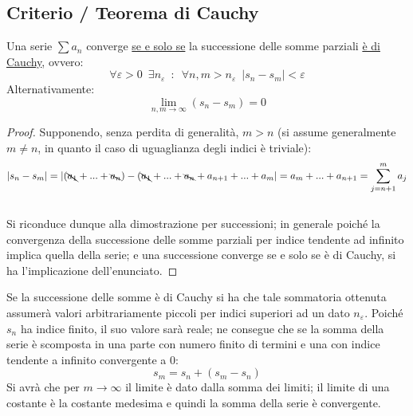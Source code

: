 \documentclass[10pt, oneside]{book}
\theoremstyle{plain}
\begin{document}
\subsection{Criterio / Teorema di Cauchy}
\begin{ther}
Una serie $\sum a_n$ converge \underline{se e solo se} la successione delle somme parziali \underline{è di Cauchy}, ovvero:
\[\forall \varepsilon > 0 \enspace \exists n_\varepsilon \enspace : \enspace \forall n, m >  n_\varepsilon \enspace |s_n - s_m| < \varepsilon\]
Alternativamente:
\[\lim \limits_{n,m \rightarrow \infty} (s_n - s_m) = 0\]
\end{ther}
\begin{proof}
Supponendo, senza perdita di generalità, $m > n$ (si assume generalmente $m \neq n$, in quanto il caso di uguaglianza degli indici è triviale):
\[|s_n - s_m| = |(\bcancel{a_1} + ... + \bcancel{a_n}) - (\bcancel{a_1} + ... + \bcancel{a_n} + a_{n+1} + ... + a_m| = a_m + ... + a_{n + 1} = \sum \limits_{j = n + 1}^{m} a_j\]
\\Si riconduce dunque alla dimostrazione per successioni; in generale poiché la convergenza della successione delle somme parziali per indice tendente ad infinito implica quella della serie; e una successione converge se e solo se è di Cauchy, si ha l'implicazione dell'enunciato.
\end{proof}
\begin{oss}
Se la successione delle somme è di Cauchy si ha che tale sommatoria ottenuta assumerà valori arbitrariamente piccoli per indici superiori ad un dato $n_\varepsilon$. Poiché $s_n$ ha indice finito, il suo valore sarà reale; ne consegue che se la somma della serie è scomposta in una parte con numero finito di termini e una con indice tendente a infinito convergente a 0:
\[s_m = s_n + (s_m - s_n)\]
Si avrà che per $m \rightarrow \infty$ il limite è dato dalla somma dei limiti; il limite di una costante è la costante medesima e quindi la somma della serie è convergente.
\end{oss}
\end{document}
